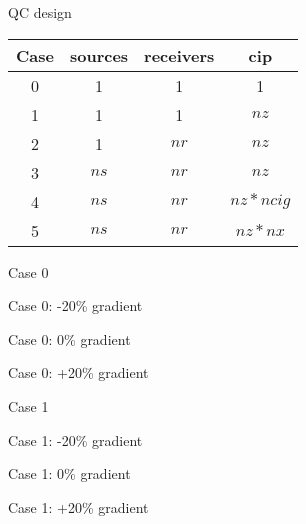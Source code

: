 \begin{frame}{QC design}

\begin{center}
    \begin{tabular}{ | c | c | c | c |}
    \hline
    Case   & sources & receivers & cip       \\ \hline
       0   &    1    &      1    &  1        \\ \hline
       1   &    1    &      1    & $nz$      \\ \hline
       2   &    1    &    $nr$   & $nz$      \\ \hline
       3   &   $ns$  &    $nr$   & $nz$      \\ \hline
       4   &   $ns$  &    $nr$   & $nz*ncig$ \\ \hline 
       5   &   $ns$  &    $nr$   & $nz*nx$   \\ 
    \hline
    \end{tabular}
\end{center}
\end{frame}
\begin{frame}{Case 0}
\end{frame}

\begin{frame}{Case 0: -20\% gradient}
\end{frame}
\begin{frame}{Case 0: 0\% gradient}
\end{frame}
\begin{frame}{Case 0: +20\% gradient}
\end{frame}

\begin{frame}{Case 1}
\end{frame}

\begin{frame}{Case 1: -20\% gradient}
\end{frame}
\begin{frame}{Case 1: 0\% gradient}
\end{frame}
\begin{frame}{Case 1: +20\% gradient}
\end{frame}


